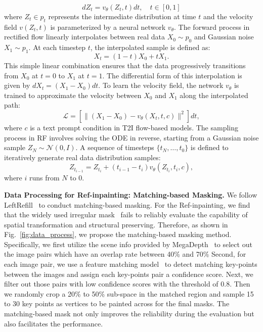 \begin{equation}
    {dZ_t} = v_\theta(Z_t, t){dt}, \quad t \in [0, 1]
\end{equation}
where $Z_t \in p_t$ represents the intermediate distribution at time $t$ and the velocity field $v(Z_t, t)$ is parameterized by a neural network $v_\theta$.
The forward process in rectified flow linearly interpolates between real data $X_0 \sim p_0$ and Gaussian noise $X_1 \sim p_1$. At each timestep $t$, the interpolated sample is defined as:
\begin{equation}
    X_t = (1 - t) X_0 + t X_1.
\end{equation}
This simple linear combination ensures that the data progressively transitions from  $X_0$ at $t=0$ to $X_1$ at $t=1$. The differential form of this interpolation is given by $dX_t = (X_1 - X_0) dt$.
To learn the velocity field, the network $v_\theta$ is trained to approximate the velocity between $X_0$ and $X_1$ along the interpolated path:
\begin{equation}
    \mathcal{L} = \left[ \| (X_1 - X_0) - v_\theta(X_t, t, c) \|^2 \right] dt,
\end{equation}
where $c$ is a text prompt condition in T2I flow-based models.
The sampling process in RF involves solving the ODE in reverse, starting from a Gaussian noise sample  $Z_N \sim \mathcal{N}(0, I)$. A sequence of timesteps $\{t_N, \ldots, t_0\}$ is defined to iteratively generate real data distribution samples:
\begin{equation} 
    Z_{t_{i-1}} = Z_{t_i} + (t_{i-1} - t_i) v_\theta(Z_{t_i}, t_i, c),
\end{equation}
where $i$ runs from $N$ to 0. 
\IEEEpubidadjcol

\label{sec:matching_mask}

\noindent\textbf{Data Processing for Ref-inpainting: Matching-based Masking.}
We follow LeftRefill~\cite{cao2024leftrefill} to conduct matching-based masking.
For the Ref-inpainting, we find that the widely used irregular mask~\cite{dong2022incremental,zhou2021transfill,zhao2022geofill} fails to reliably evaluate the capability of spatial transformation and structural preserving. Therefore, as shown in Fig.~\ref{fig:data_process}, we propose the matching-based masking method.
Specifically, we first utilize the scene info provided by MegaDepth~\cite{li2018megadepth} to select out the image pairs which have an overlap rate between 40\% and 70\% Second, for each image pair, we use a feature matching model~\cite{tang2022quadtree} to detect matching key-points between the images and assign each key-points pair a confidence score. 
Next, we filter out those pairs with low confidence scores with the threshold of 0.8. Then we randomly crop a 20\% to 50\% sub-space in the matched region and sample 15 to 30 key points as vertices to be painted across for the final masks. 
The matching-based mask not only improves the reliability during the evaluation but also facilitates the performance.

